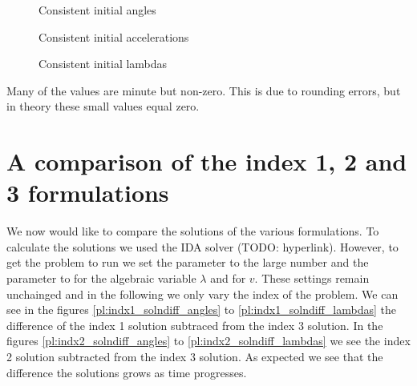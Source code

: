 \documentclass{report}
\begin{document}
\begin{figure}[h]
\centering
\begin{minipage}[b]{0.3\textwidth}
\centering

\caption{Consistent initial angles}
\label{tb:initial_angles}
\end{minipage}
\hfill
\begin{minipage}[b]{0.3\textwidth}
\centering

\caption{Consistent initial accelerations}
\label{tb:initial_accelerations}
\end{minipage}
\hfill
\begin{minipage}[b]{0.3\textwidth}
\centering

\caption{Consistent initial lambdas}
\label{tb:initial_lambdas}
\end{minipage}
\end{figure}

Many of the values are minute but non-zero. This is due to rounding errors, but in theory these small values equal zero.

\section*{A comparison of the index 1, 2 and 3 formulations}

We now would like to compare the solutions of the various formulations. To calculate the solutions we used the IDA solver (TODO: hyperlink). However, to get the problem to run we set the  parameter to the large number  and the  parameter to  for the algebraic variable $\lambda$ and for $v$. These settings remain unchainged and in the following we only vary the index of the problem. We can see in the figures \ref{pl:indx1_solndiff_angles} to \ref{pl:indx1_solndiff_lambdas} the difference of the index 1 solution subtraced from the index 3 solution. In the figures \ref{pl:indx2_solndiff_angles} to \ref{pl:indx2_solndiff_lambdas} we see the index 2 solution subtracted from the index 3 solution. As expected we see that the difference the solutions grows as time progresses.
\end{document}
